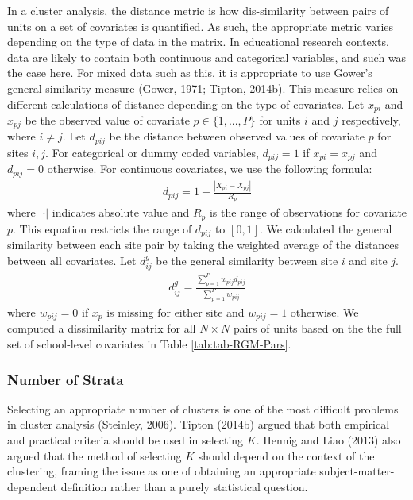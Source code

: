\documentclass[
  english,
  man,floatsintext]{apa6}
\begin{document}
In a cluster analysis, the distance metric is how dis-similarity between pairs of units on a set of covariates is quantified. As such, the appropriate metric varies depending on the type of data in the matrix.
In educational research contexts, data are likely to contain both continuous and categorical variables, and such was the case here. For mixed data such as this, it is appropriate to use Gower's general similarity measure (Gower, 1971; Tipton, 2014b). This measure relies on different calculations of distance depending on the type of covariates. Let \(x_{pi}\) and \(x_{pj}\) be the observed value of covariate \(p \in \{1, ..., P\}\) for units \(i\) and \(j\) respectively, where \(i \ne j\). Let \(d_{pij}\) be the distance between observed values of covariate \(p\) for sites \(i,j\). For categorical or dummy coded variables, \(d_{pij} = 1\) if \(x_{pi} = x_{pj}\) and \(d_{pij} = 0\) otherwise. For continuous covariates, we use the following formula:
\begin{align}
\label{eq:gowerdist-p}
d_{pij} = 1 - \frac{|X_{pi} - X_{pj}|}{R_p}
\end{align}
where \(|\cdot|\) indicates absolute value and \(R_p\) is the range of observations for covariate \(p\). This equation restricts the range of \(d_{pij}\) to \([0,1]\). We calculated the general similarity between each site pair by taking the weighted average of the distances between all covariates. Let \(d^{g}_{ij}\) be the general similarity between site \(i\) and site \(j\).
\begin{align}
\label{eq:gowerdist}
d^{g}_{ij} = \frac{\sum^P_{p = 1} w_{pij} d_{pij}}{\sum^P_{p = 1} w_{pij}}
\end{align}
where \(w_{pij} = 0\) if \(x_p\) is missing for either site and \(w_{pij} = 1\) otherwise.
We computed a dissimilarity matrix for all \(N \times N\) pairs of units based on the the full set of school-level covariates in Table \ref{tab:tab-RGM-Pars}.

\hypertarget{number-of-strata}{%
\subsubsection{Number of Strata}\label{number-of-strata}}

Selecting an appropriate number of clusters is one of the most difficult problems in cluster analysis (Steinley, 2006). Tipton (2014b) argued that both empirical and practical criteria should be used in selecting \(K\). Hennig and Liao (2013) also argued that the method of selecting \(K\) should depend on the context of the clustering, framing the issue as one of obtaining an appropriate subject-matter-dependent definition rather than a purely statistical question.
\end{document}
